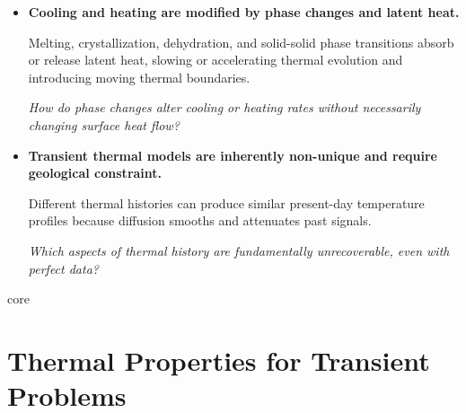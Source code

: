 {\begin{itemize}
    \textit{Over what depths and timescales do different surface processes influence subsurface temperatures?}


    \item \textbf{Cooling and heating are modified by phase changes and latent heat.}

    Melting, crystallization, dehydration, and solid-solid phase transitions absorb or
    release latent heat, slowing or accelerating thermal evolution and introducing
    moving thermal boundaries.

    \textit{How do phase changes alter cooling or heating rates without necessarily changing surface heat flow?}


    \item \textbf{Transient thermal models are inherently non-unique and require geological constraint.}

    Different thermal histories can produce similar present-day temperature profiles
    because diffusion smooths and attenuates past signals.
    
    \textit{Which aspects of thermal history are fundamentally unrecoverable, even with perfect data?}
\end{itemize}
}{core}

\section{Thermal Properties for Transient Problems}

